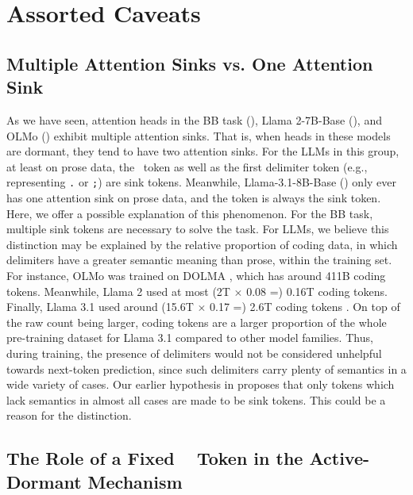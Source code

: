 \section{Assorted Caveats}\label{sec:caveats}

\subsection{Multiple Attention Sinks vs. One Attention Sink}\label{sub:multiple_sinks_discussion}

As we have seen, attention heads in the BB task (), Llama 2-7B-Base (), and OLMo () exhibit multiple attention sinks. That is, when heads in these models are dormant, they tend to have two attention sinks. For the LLMs in this group, at least on prose data, the \bos~token as well as the first delimiter token (e.g., representing \texttt{.} or \texttt{;}) are sink tokens. Meanwhile, Llama-3.1-8B-Base () only ever has one attention sink on prose data, and the \bos{} token is always the sink token. Here, we offer a possible explanation of this phenomenon. For the BB task, multiple sink tokens are necessary to solve the task. For LLMs, we believe this distinction may be explained by the relative proportion of coding data, in which delimiters have a greater semantic meaning than prose, within the training set. For instance, OLMo was trained on DOLMA \citep{soldaini2024dolma}, which has around 411B coding tokens. Meanwhile, Llama 2 used at most (2T \(\times\) 0.08 =) 0.16T coding tokens. Finally, Llama 3.1 used around (15.6T \(\times\) 0.17 =) 2.6T coding tokens \citep{dubey2024llama}. On top of the raw count being larger, coding tokens are a larger proportion of the whole pre-training dataset for Llama 3.1 compared to other model families. Thus, during training, the presence of delimiters would not be considered unhelpful towards next-token prediction, since such delimiters carry plenty of semantics in a wide variety of cases. Our earlier hypothesis in  proposes that only tokens which lack semantics in almost all cases are made to be sink tokens. This could be a reason for the distinction.

\subsection{The Role of a Fixed \bos~ Token in the Active-Dormant Mechanism}\label{sub:fixed_bos}

